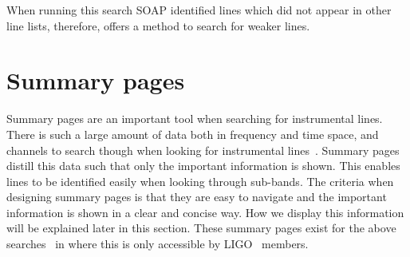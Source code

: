 When running this search SOAP identified lines which did not appear in other
line lists, therefore, offers a method to search for weaker lines.
~


\clearpage 
\section{\label{detchar:summary}Summary pages}

Summary pages are an important tool when searching for instrumental lines.
There is such a large amount of data both in frequency and time space, and
channels to search though when looking for instrumental lines~. Summary pages
distill this data such that only the important information is shown. This
enables lines to be identified easily when looking through sub-bands. The
criteria when designing summary pages is that they are easy to navigate and the
important information is shown in a clear and concise way.  How we display this
information will be explained later in this section.  These summary pages exist
for the above searches~ in \citep{bayleyHome} where this is only accessible by
\gls{LIGO}~ members.

